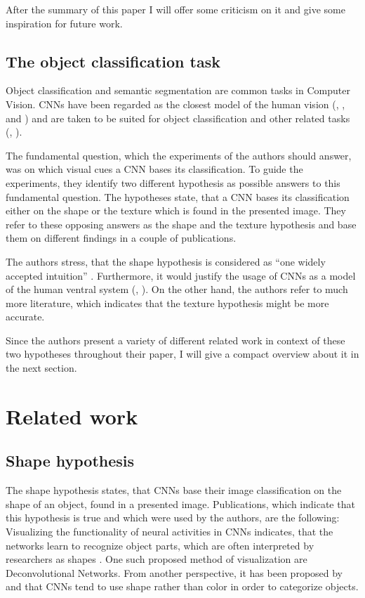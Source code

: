 \documentclass[runningheads,a4paper]{llncs}
\begin{document}
After the summary of this paper I will offer some criticism on it and give some inspiration for future work.


\subsection{The object classification task}
Object classification and semantic segmentation are common tasks in Computer Vision.  CNNs have been regarded as the closest model of the human vision (\cite{kubilius2016}, \cite{ritter2017cognitive}, \cite{cadieu2014deep} and \cite{yamins2014performance}) and are taken to be suited for object classification and other related tasks (\cite{krizhevsky2012imagenet}, \cite{long2015fully}).

The fundamental question, which the experiments of the authors should answer, was on which visual cues a CNN bases its classification. To guide the experiments, they identify two different hypothesis as possible answers to this fundamental question. The hypotheses state, that a CNN bases its classification either on the shape or the texture which is found in the presented image. They refer to these opposing answers as the shape and the texture hypothesis and base them on different findings in a couple of publications.

The authors stress, that the shape hypothesis is considered as ``one widely accepted intuition'' \citep{geirhos2018imagenet}. Furthermore, it would justify the usage of CNNs as a model of the human ventral system (\cite{cadieu2014deep}, \cite{yamins2014performance}). On the other hand, the authors refer to much more literature, which indicates that the texture hypothesis might be more accurate.

Since the authors present a variety of different related work in context of these two hypotheses throughout their paper, I will give a compact overview about it in the next section.

\section{Related work}

\subsection{Shape hypothesis}
The shape hypothesis states, that CNNs base their image classification on the shape of an object, found in a presented image. Publications, which indicate that this hypothesis is true and which were used by the authors, are the following:\\
Visualizing the functionality of neural activities in CNNs indicates, that the networks learn to recognize object parts, which are often interpreted by researchers as shapes \citep{zeiler2014visualizing}. One such proposed method of visualization are Deconvolutional Networks. From another perspective, it has been proposed by \citet{ritter2017cognitive} and \citet{geirhos2018generalisation} that CNNs tend to use shape rather than color in order to categorize objects.
\end{document}
